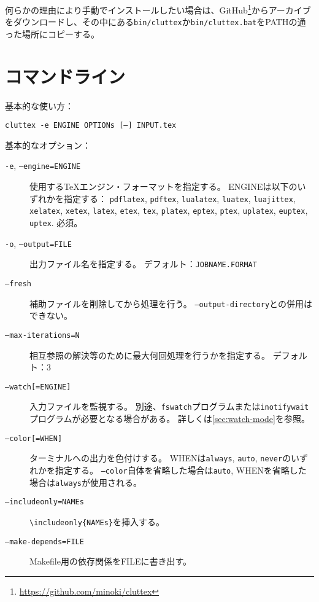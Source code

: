\documentclass[a4paper]{ltjsreport}
\newcommand\texcmd[1]{\texttt{\textbackslash #1}}
\newcommand\metavar[1]{\textsf{#1}}
\begin{document}
何らかの理由により手動でインストールしたい場合は、GitHub\footnote{\url{https://github.com/minoki/cluttex}}からアーカイブをダウンロードし、その中にある\texttt{bin/cluttex}か\texttt{bin/cluttex.bat}をPATHの通った場所にコピーする。

\section{コマンドライン}
基本的な使い方：
\begin{center}
  \texttt{cluttex -e \metavar{ENGINE} \metavar{OPTIONs} [--] \metavar{INPUT}.tex}
\end{center}

基本的なオプション：
\begin{description}
\item[\texttt{-e}, \texttt{--engine=\metavar{ENGINE}}]
  使用する\TeX{}エンジン・フォーマットを指定する。
  \metavar{ENGINE}は以下のいずれかを指定する：
  \texttt{pdflatex}, \texttt{pdftex},
  \texttt{lualatex}, \texttt{luatex}, \texttt{luajittex},
  \texttt{xelatex}, \texttt{xetex},
  \texttt{latex}, \texttt{etex}, \texttt{tex},
  \texttt{platex}, \texttt{eptex}, \texttt{ptex},
  \texttt{uplatex}, \texttt{euptex}, \texttt{uptex}.
  必須。
\item[\texttt{-o}, \texttt{--output=\metavar{FILE}}]
  出力ファイル名を指定する。
  デフォルト：\texttt{\metavar{JOBNAME}.\metavar{FORMAT}}
\item[\texttt{--fresh}]
  補助ファイルを削除してから処理を行う。
  \texttt{--output-directory}との併用はできない。
\item[\texttt{--max-iterations=\metavar{N}}]
  相互参照の解決等のために最大何回処理を行うかを指定する。
  デフォルト：3
\item[\texttt{--watch[=\metavar{ENGINE}]}]
  入力ファイルを監視する。
  別途、\texttt{fswatch}プログラムまたは\texttt{inotifywait}プログラムが必要となる場合がある。
  詳しくは\cref{sec:watch-mode}を参照。
\item[\texttt{--color[=\metavar{WHEN}]}]
  ターミナルへの出力を色付けする。
  \metavar{WHEN}は\texttt{always}, \texttt{auto}, \texttt{never}のいずれかを指定する。
  \texttt{--color}自体を省略した場合は\texttt{auto}, \metavar{WHEN}を省略した場合は\texttt{always}が使用される。
\item[\texttt{--includeonly=\metavar{NAMEs}}]
  \texttt{\texcmd{includeonly}\{\metavar{NAMEs}\}}を挿入する。
\item[\texttt{--make-depends=\metavar{FILE}}]
  Makefile用の依存関係を\metavar{FILE}に書き出す。

\end{description}
\end{document}
